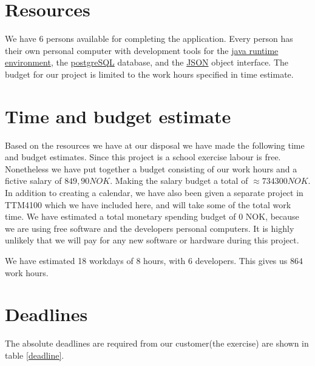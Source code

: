 \documentclass[a4paper, english, 12pt]{article}
\begin{document}

\section{Resources}
We have 6 persons available for completing the application. Every person has their own personal computer with  development tools for the \href{http://www.oracle.com/technetwork/java/javase/downloads/java-se-jre-7-download-432155.html}{java runtime environment}, the \href{http://www.postgresql.org/}{postgreSQL} database, 
and the \href{http://json.org/}{JSON} object interface.
The budget for our project is limited to the work hours specified in time estimate.

\section{Time and budget estimate}
Based on the resources we have at our disposal we have made the following time and budget estimates.
Since this project is a school exercise labour is free. Nonetheless we have put together a budget consisting of our work hours and a fictive salary of $849,90 NOK$. Making the salary budget a total of $\approx 734300 NOK$. In addition to creating a calendar, we have also been given a separate project in TTM4100 which we have included here, and will take some of the total work time.
We have estimated a total monetary spending budget of 0 NOK, because we are using free software and the developers personal computers. It is highly unlikely that we will pay for any new software or hardware during this project. 

We have estimated 18 workdays of 8 hours, with 6 developers. This gives us $864$ work hours.

\section{Deadlines}
The absolute deadlines are required from our customer(the exercise) are shown in table \ref{deadline}.
\end{document}
